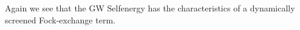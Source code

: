 \documentclass[12pt,a4paper]{scrartcl}
\numberwithin{equation}{section}
\begin{document}
Again we see that the GW Selfenergy has the characteristics
of a dynamically screened Fock-exchange term. 
\end{document}
